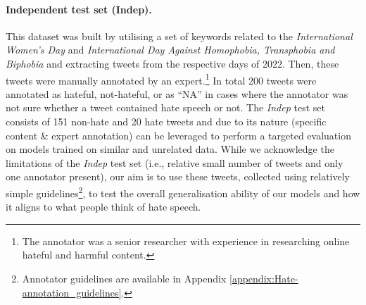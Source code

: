 \paragraph{Independent test set (Indep).} This dataset was built by utilising a set of keywords related to the \textit{International Women's Day} and \textit{International Day Against Homophobia, Transphobia and Biphobia} and extracting tweets from the respective days of 2022. Then, these tweets were manually annotated by an expert.\footnote{The annotator was a senior researcher with experience in researching online hateful and harmful content.} In total 200 tweets were annotated as hateful, not-hateful, or as ``NA'' in cases where the annotator was not sure whether a tweet contained hate speech or not. The \textit{Indep} test set consists of 151 non-hate and 20 hate tweets and due to its nature (specific content \& expert annotation) can be leveraged to perform a targeted evaluation on models trained on similar and unrelated data. While we acknowledge the limitations of the \textit{Indep} test set (i.e., relative small number of tweets and only one annotator present), our aim is to use these tweets, collected using relatively simple guidelines\footnote{Annotator guidelines are available in Appendix \ref{appendix:Hate-annotation_guidelines}.}, to test the overall generalisation ability of our models and how it aligns to what people think of hate speech. 
     

